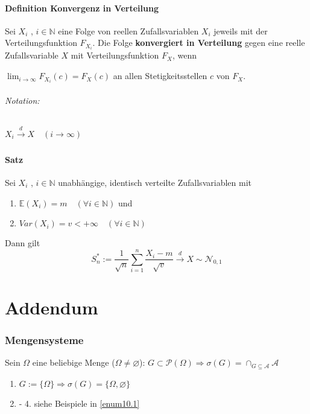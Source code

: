 \documentclass[12pt,a4paper]{article}
\begin{document}
	\subsection{Definition Konvergenz in Verteilung}
	Sei $X_i$ , $i\in\mathbb{N}$ eine Folge von reellen Zufallsvariablen $X_i$ jeweils mit der Verteilungsfunktion $F_{X_i}$. Die Folge \textbf{konvergiert in Verteilung} gegen eine reelle Zufallsvariable $X$ mit Verteilungsfunktion $F_X$, wenn
	\begin{center}
	$\lim_{i\to\infty} F_{X_i}(c)=F_X(c)$ an allen Stetigkeitsstellen $c$ von $F_X$. 	
	\end{center}
	
	\paragraph{Notation:} $X_i \xrightarrow[]{d} X \quad (i\to\infty)$
	
	\subsection{Satz}
	Sei $X_i$ , $i\in\mathbb{N}$ unabhängige, identisch verteilte Zufallsvariablen mit
	\begin{enumerate}
		\item $\mathbb{E}(X_i) = m \quad (\forall i\in\mathbb{N})$ und 
		\item $Var(X_i)=v<+\infty \quad (\forall i\in\mathbb{N})$
	\end{enumerate}	 
	Dann gilt
	$$S_n^{*} := \frac{1}{\sqrt{n}} \sum_{i=1}^n \frac{X_i -m}{\sqrt{v}} \xrightarrow[]{d} X\sim\mathcal{N}_{0,1}$$
	
	\pagebreak
	
	\part{Addendum}
	
	\section*{Mengensysteme}
	Sein $\Omega$ eine beliebige Menge ($\Omega \neq \varnothing$): $\displaystyle G\subset \mathcal{P}(\Omega) \Rightarrow \sigma(G) = \cap_{G\subseteq \mathcal{A}} \mathcal{A}$
	\begin{enumerate}
		\item $\displaystyle G:=\{ \Omega \} \Rightarrow \sigma(G)=\{\Omega ,\varnothing\}$
		\item - 4. siehe Beispiele in \ref{enum10.1} 
	\end{enumerate}
\end{document}
